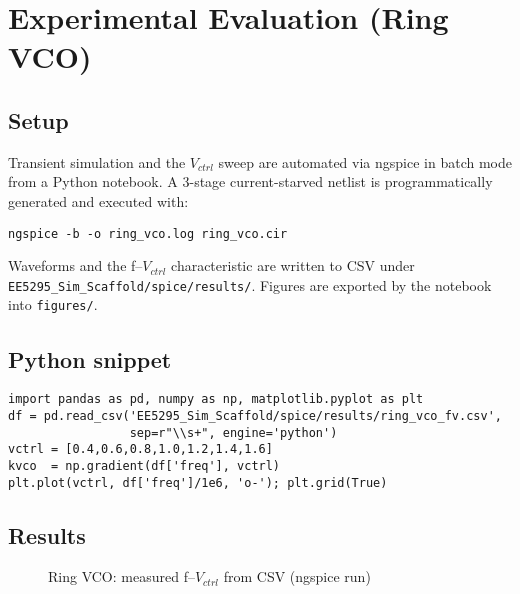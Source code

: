 \section{Experimental Evaluation (Ring VCO)}
\label{sec:ring_vco_experiment}
\subsection*{Setup}
Transient simulation and the \(V_{ctrl}\) sweep are automated via ngspice in batch mode from a Python notebook. A 3-stage current-starved netlist is programmatically generated and executed with:
\begin{lstlisting}[style=codebash, caption={Batch run ngspice for the ring VCO}]
ngspice -b -o ring_vco.log ring_vco.cir
\end{lstlisting}

Waveforms and the f--\(V_{ctrl}\) characteristic are written to CSV under \texttt{EE5295\_Sim\_Scaffold/spice/results/}. Figures are exported by the notebook into \texttt{figures/}.

\subsection*{Python snippet}
\begin{lstlisting}[style=codepy, caption={Load CSV and compute $K_{VCO}$ in Python}]
import pandas as pd, numpy as np, matplotlib.pyplot as plt
df = pd.read_csv('EE5295_Sim_Scaffold/spice/results/ring_vco_fv.csv',
                 sep=r"\\s+", engine='python')
vctrl = [0.4,0.6,0.8,1.0,1.2,1.4,1.6]
kvco  = np.gradient(df['freq'], vctrl)
plt.plot(vctrl, df['freq']/1e6, 'o-'); plt.grid(True)
\end{lstlisting}

\subsection*{Results}
\begin{figure}[H]
  \centering
  \caption{Ring VCO: measured f--$V_{ctrl}$ from CSV (ngspice run)}
\end{figure}

